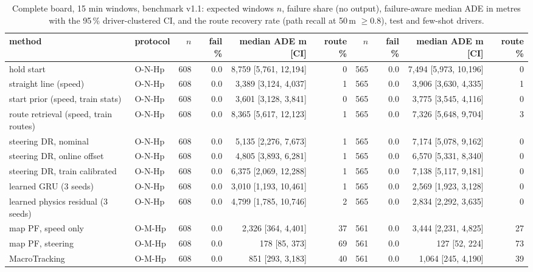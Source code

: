 \begin{table}[t]\centering\scriptsize\setlength{\tabcolsep}{3pt}
\caption{Complete board, 15 min windows, benchmark v1.1: expected windows $n$, failure share (no output), failure-aware median ADE in metres with the 95\,\% driver-clustered CI, and the route recovery rate (path recall at 50\,m $\ge 0.8$), test and few-shot drivers.}\label{tab:supp_main_w15}
\begin{tabular}{llrrrrrrrr}\toprule
method & protocol & $n$ & fail \% & median ADE m [CI] & route \% & $n$ & fail \% & median ADE m [CI] & route \% \\\midrule
hold start & O-N-Hp & 608 & 0.0 & 8{,}759 [5{,}761, 12{,}194] & 0 & 565 & 0.0 & 7{,}494 [5{,}973, 10{,}196] & 0 \\
straight line (speed) & O-N-Hp & 608 & 0.0 & 3{,}389 [3{,}124, 4{,}037] & 1 & 565 & 0.0 & 3{,}906 [3{,}630, 4{,}335] & 1 \\
start prior (speed, train stats) & O-N-Hp & 608 & 0.0 & 3{,}601 [3{,}128, 3{,}841] & 0 & 565 & 0.0 & 3{,}775 [3{,}545, 4{,}116] & 0 \\
route retrieval (speed, train routes) & O-N-Hp & 608 & 0.0 & 8{,}365 [5{,}617, 12{,}123] & 1 & 565 & 0.0 & 7{,}326 [5{,}648, 9{,}704] & 3 \\
steering DR, nominal & O-N-Hp & 608 & 0.0 & 5{,}135 [2{,}276, 7{,}673] & 1 & 565 & 0.0 & 7{,}174 [5{,}078, 9{,}162] & 0 \\
steering DR, online offset & O-N-Hp & 608 & 0.0 & 4{,}805 [3{,}893, 6{,}281] & 1 & 565 & 0.0 & 6{,}570 [5{,}331, 8{,}340] & 0 \\
steering DR, train calibrated & O-N-Hp & 608 & 0.0 & 6{,}375 [2{,}069, 12{,}288] & 1 & 565 & 0.0 & 7{,}138 [5{,}117, 9{,}181] & 0 \\
learned GRU (3 seeds) & O-N-Hp & 608 & 0.0 & 3{,}010 [1{,}193, 10{,}461] & 1 & 565 & 0.0 & 2{,}569 [1{,}923, 3{,}128] & 0 \\
learned physics residual (3 seeds) & O-N-Hp & 608 & 0.0 & 4{,}799 [1{,}785, 10{,}746] & 2 & 565 & 0.0 & 2{,}834 [2{,}292, 3{,}635] & 0 \\
map PF, speed only & O-M-Hp & 608 & 0.0 & 2{,}326 [364, 4{,}401] & 37 & 561 & 0.0 & 3{,}444 [2{,}231, 4{,}825] & 27 \\
map PF, steering & O-M-Hp & 608 & 0.0 & 178 [85, 373] & 69 & 561 & 0.0 & 127 [52, 224] & 73 \\
MacroTracking & O-M-Hp & 608 & 0.0 & 851 [293, 3{,}183] & 40 & 561 & 0.0 & 1{,}064 [245, 4{,}190] & 39 \\

\end{tabular}
\end{table}
